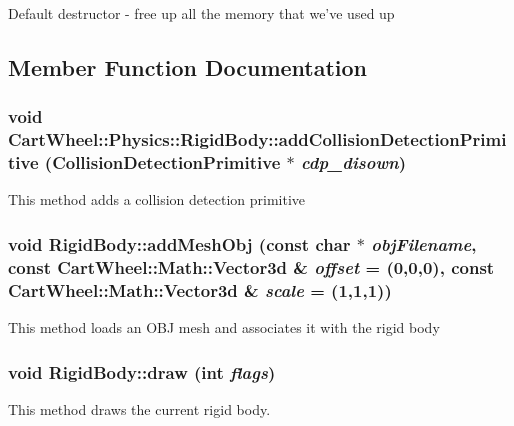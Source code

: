 Default destructor -\/ free up all the memory that we've used up 

\subsection{Member Function Documentation}
\hypertarget{classCartWheel_1_1Physics_1_1RigidBody_a132c2940ca25348ce6188de62eb7f670}{
\subsubsection[{addCollisionDetectionPrimitive}]{\setlength{\rightskip}{0pt plus 5cm}void CartWheel::Physics::RigidBody::addCollisionDetectionPrimitive ({\bf CollisionDetectionPrimitive} $\ast$ {\em cdp\_\-disown})}}
\label{classCartWheel_1_1Physics_1_1RigidBody_a132c2940ca25348ce6188de62eb7f670}
This method adds a collision detection primitive \hypertarget{classCartWheel_1_1Physics_1_1RigidBody_abc9171bef06daef1be03e0222f3274e6}{
\subsubsection[{addMeshObj}]{\setlength{\rightskip}{0pt plus 5cm}void RigidBody::addMeshObj (const char $\ast$ {\em objFilename}, \/  const {\bf CartWheel::Math::Vector3d} \& {\em offset} = {(0,0,0)}, \/  const {\bf CartWheel::Math::Vector3d} \& {\em scale} = {(1,1,1)})}}
\label{classCartWheel_1_1Physics_1_1RigidBody_abc9171bef06daef1be03e0222f3274e6}
This method loads an OBJ mesh and associates it with the rigid body \hypertarget{classCartWheel_1_1Physics_1_1RigidBody_a7ab4f12e9d1a403e76022cd8f3124d96}{
\subsubsection[{draw}]{\setlength{\rightskip}{0pt plus 5cm}void RigidBody::draw (int {\em flags})}}
\label{classCartWheel_1_1Physics_1_1RigidBody_a7ab4f12e9d1a403e76022cd8f3124d96}
This method draws the current rigid body. 

